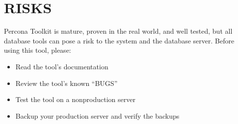 \documentclass[letterpaper,10pt,english]{sphinxmanual}
\begin{document}
\section{RISKS}
\label{\detokenize{mariadb-stat-browser:risks}}
Percona Toolkit is mature, proven in the real world, and well tested,
but all database tools can pose a risk to the system and the database
server.  Before using this tool, please:
\begin{itemize}
\item {} 
Read the tool’s documentation

\item {} 
Review the tool’s known “BUGS”

\item {} 
Test the tool on a non\sphinxhyphen{}production server

\item {} 
Backup your production server and verify the backups

\end{itemize}
\end{document}
